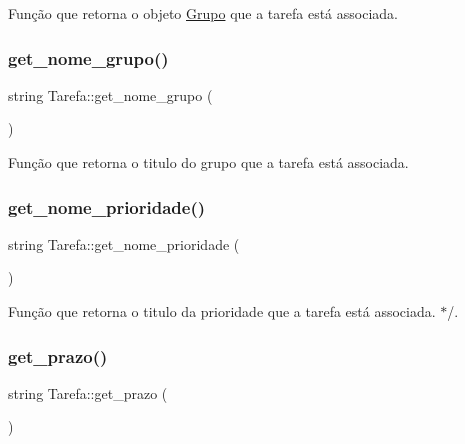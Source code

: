 Função que retorna o objeto \hyperlink{classGrupo}{Grupo} que a tarefa está associada. 

\mbox{\label{classTarefa_adacf20f53dfea470d6899e7a82d0519c}} 
\subsubsection{\texorpdfstring{get\+\_\+nome\+\_\+grupo()}{get\_nome\_grupo()}}
{\footnotesize\ttfamily string Tarefa\+::get\+\_\+nome\+\_\+grupo (\begin{DoxyParamCaption}{ }\end{DoxyParamCaption})}



Função que retorna o titulo do grupo que a tarefa está associada. 

\mbox{\label{classTarefa_a9918d709f8b7da0dfe2e60255dd7b167}} 
\subsubsection{\texorpdfstring{get\+\_\+nome\+\_\+prioridade()}{get\_nome\_prioridade()}}
{\footnotesize\ttfamily string Tarefa\+::get\+\_\+nome\+\_\+prioridade (\begin{DoxyParamCaption}{ }\end{DoxyParamCaption})}



Função que retorna o titulo da prioridade que a tarefa está associada. $\ast$/. 

\mbox{\label{classTarefa_a076d7bd66a444b26cb8d52ff34bbe39e}} 
\subsubsection{\texorpdfstring{get\+\_\+prazo()}{get\_prazo()}}
{\footnotesize\ttfamily string Tarefa\+::get\+\_\+prazo (\begin{DoxyParamCaption}{ }\end{DoxyParamCaption})}



